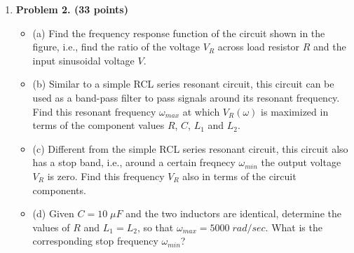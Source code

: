 \begin{enumerate}
\item {\bf Problem 2. (33 points)} 

\begin{itemize}
\item (a) Find the frequency response function of the circuit shown in 
the figure, i.e., find the ratio of the voltage $V_R$ across load resistor
$R$ and the input sinusoidal voltage $V$. 

\item (b) Similar to a simple RCL series resonant circuit, this circuit
can be used as a band-pass filter to pass signals around its resonant 
frequency. Find this resonant frequency $\omega_{max}$ at which 
$V_R(\omega)$ is maximized in terms of the component values $R$, $C$, 
$L_1$ and $L_2$. 

\item (c) Different from the simple RCL series resonant circuit, this 
circuit also has a stop band, i.e., around a certain freqnecy 
$\omega_{min}$ the output voltage $V_R$ is zero. Find this frequency 
$V_R$ also in terms of the circuit components. 

\item (d) Given $C=10\;\mu F$ and the two inductors are identical, 
determine the values of $R$ and $L_1=L_2$, so that $\omega_{max}=5000
\;rad/sec$. What is the corresponding stop frequency $\omega_{min}$?

\end{itemize}


%  
%  


\end{enumerate}

